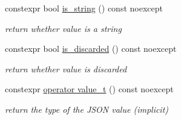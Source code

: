 \begin{DoxyCompactItemize}
constexpr bool \hyperlink{classnlohmann_1_1basic__json_ab22c8d61eca51f0308c263487bd35f03}{is\+\_\+string} () const  noexcept
\begin{DoxyCompactList}\small\item\em return whether value is a string \end{DoxyCompactList}\item 
constexpr bool \hyperlink{classnlohmann_1_1basic__json_a66c051561828b2c4eeaad896a72bec99}{is\+\_\+discarded} () const  noexcept
\begin{DoxyCompactList}\small\item\em return whether value is discarded \end{DoxyCompactList}\item 
constexpr \hyperlink{classnlohmann_1_1basic__json_a101cd941eb8a5c299660449c71d0e75e}{operator value\+\_\+t} () const  noexcept
\begin{DoxyCompactList}\small\item\em return the type of the J\+S\+O\+N value (implicit) \end{DoxyCompactList}\end{DoxyCompactItemize}

